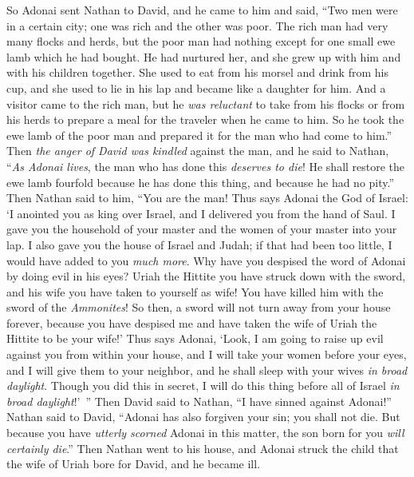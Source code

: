 \begin{biblechapter} %
 So Adonai sent Nathan to David, and he came to him and said, “Two men were in a certain city; one was rich and the other was poor.
\verse The rich man had very many flocks and herds,
\verse but the poor man had nothing except for one small ewe lamb which he had bought. He had nurtured her, and she grew up with him and with his children together. She used to eat from his morsel and drink from his cup, and she used to lie in his lap and became like a daughter for him.
\verse And a visitor came to the rich man, but he \textit{was reluctant} to take from his flocks or from his herds to prepare a meal for the traveler when he came to him. So he took the ewe lamb of the poor man and prepared it for the man who had come to him.”
\verse Then \textit{the anger of David was kindled} against the man, and he said to Nathan, “\textit{As Adonai lives}, the man who has done this \textit{deserves to die}!
\verse He shall restore the ewe lamb fourfold because he has done this thing, and because he had no pity.”
\verse Then Nathan said to him, “You are the man! Thus says Adonai the God of Israel: ‘I anointed you as king over Israel, and I delivered you from the hand of Saul.
\verse I gave you the household of your master and the women of your master into your lap. I also gave you the house of Israel and Judah; if that had been too little, I would have added to you \textit{much more}.
\verse Why have you despised the word of Adonai by doing evil in his eyes? Uriah the Hittite you have struck down with the sword, and his wife you have taken to yourself as wife! You have killed him with the sword of the \textit{Ammonites}!
\verse So then, a sword will not turn away from your house forever, because you have despised me and have taken the wife of Uriah the Hittite to be your wife!’
\verse Thus says Adonai, ‘Look, I am going to raise up evil against you from within your house, and I will take your women before your eyes, and I will give them to your neighbor, and he shall sleep with your wives \textit{in broad daylight}.
\verse Though you did this in secret, I will do this thing before all of Israel \textit{in broad daylight}!’ ”
 Then David said to Nathan, “I have sinned against Adonai!” Nathan said to David, “Adonai has also forgiven your sin; you shall not die.
\verse But because you have \textit{utterly scorned} Adonai in this matter, the son born for you \textit{will certainly die}.”
\verse Then Nathan went to his house, and Adonai struck the child that the wife of Uriah bore for David, and he became ill.

\end{biblechapter}
